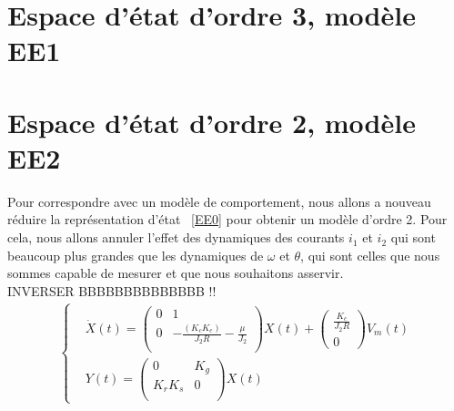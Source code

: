 \section{Espace d'état d'ordre 3, modèle EE1}
\section{Espace d'état d'ordre 2, modèle EE2}
Pour correspondre avec un modèle de comportement, nous allons a nouveau réduire la représentation d'état ~\eqref{EE0} pour obtenir un modèle d'ordre 2. Pour cela, nous allons annuler l'effet des dynamiques des courants $i_1$ et $i_2$ qui sont beaucoup plus grandes que les dynamiques de $\omega$ et $\theta$, qui sont celles que nous sommes capable de mesurer et que nous souhaitons asservir.\\
INVERSER BBBBBBBBBBBBBB !!  
\begin{align}
\label{EE2}
\left\lbrace
\begin{aligned}
&\dot{X}(t) 
=
 \begin{pmatrix}
0 &	1 \\
0	&	-\frac{(K_c K_e)}{J_2 R}-\frac{\mu}{J_2}\\
\end{pmatrix}X(t)
+
\begin{pmatrix}
\frac{K_c}{J_2 R}\\
0
\end{pmatrix} 
V_m(t)\\
&Y(t) = \begin{pmatrix}
0	&	K_g	\\
K_rK_s	&	0	\\
\end{pmatrix}X(t)
\end{aligned}
\right.
\end{align}


